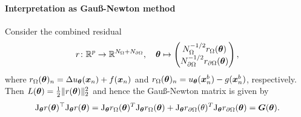 \paragraph{Interpretation as Gau\ss-Newton method}
Consider the combined residual
\begin{equation*}
    r\colon\mathbb R^p\to\mathbb R^{N_\Omega+N_{\partial\Omega}}, \quad 
    {\bm{\theta}} 
    \mapsto 
    \begin{pmatrix}
        N_\Omega^{-1/2}r_\Omega({\bm{\theta}}) \\ 
        N_{\partial\Omega}^{-1/2}r_{\partial\Omega}({\bm{\theta}})
    \end{pmatrix},
\end{equation*}
where $r_{\Omega}({\bm{\theta}})_n = \Delta u_{\bm{\theta}}({\bm{x}}_n) + f({\bm{x}}_n)$ and $r_{\Omega}({\bm{\theta}})_n = u_{\bm{\theta}}({\bm{x}}_n^b) - g({\bm{x}}_n^b)$, respectively. 
Then %
$L({\bm{\theta}}) = \frac12 \lVert r({\bm{\theta}}) \rVert_2^2$ and hence the Gau\ss-Newton matrix is given by
\begin{equation*}
    \mathrm{J}_{\bm{\theta}} r({\bm{\theta}})^\top \mathrm{J}_{\bm{\theta}} r({\bm{\theta}}) = \mathrm{J}_{\bm{\theta}} r_\Omega({\bm{\theta}})^T \mathrm{J}_{\bm{\theta}} r_\Omega({\bm{\theta}}) + \mathrm{J}_{\bm{\theta}} r_{\partial\Omega}(\theta)^T \mathrm{J}_{\bm{\theta}} r_{\partial\Omega}({\bm{\theta}}) = {\bm{G}}({\bm{\theta}}). 
\end{equation*}

